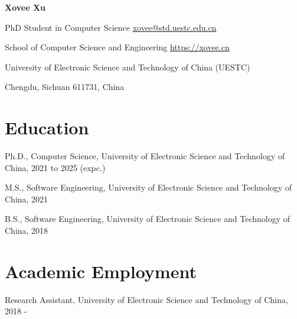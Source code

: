 \documentclass{article}
\begin{document}
\begin{center}
    \vspace*{5pt}
    \Huge{
    \textbf{Xovee Xu}}
\end{center}
\vspace{15pt}



\setlength{\parskip}{1pt}

\noindent PhD Student in Computer Science \hfill \href{mailto:xovee@std.uestc.edu.cn}{xovee@std.uestc.edu.cn}

\noindent School of Computer Science and Engineering \hfill \url{https://xovee.cn}

\noindent University of Electronic Science and Technology of China (UESTC)

\noindent Chengdu, Sichuan 611731, China


\setlength{\parskip}{3pt}

\vspace{-8pt}
\section*{Education}
\vspace{-4pt}
\indent 

Ph.D., Computer Science, University of Electronic Science and Technology of China, 2021 to 2025 (expc.)

M.S., Software Engineering, University of Electronic Science and Technology of China, 2021

B.S., Software Engineering, University of Electronic Science and Technology of China, 2018

\vspace{-8pt}
\section*{Academic Employment}
\vspace{-8pt}
\indent

Research Assistant, University of Electronic Science and Technology of China, 2018 -







\vspace{-8pt}
\end{document}
